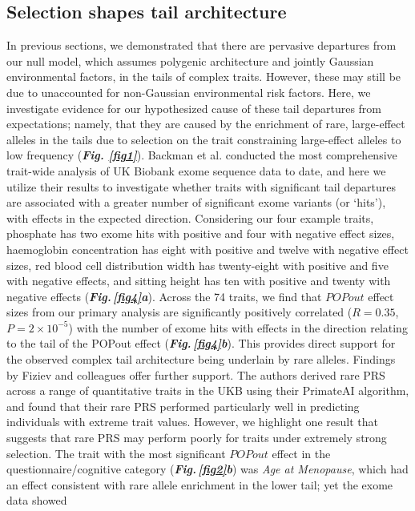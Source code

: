 \documentclass[12pt]{zHenriquesLab-StyleBioRxiv}
\newcommand\fref[1]{\normalsize{\textbf{\textit{Fig. \ref{#1}}}}\normalsize{}}
\newcommand\dref[2]{\normalsize{\textbf{\textit{Fig.\,\ref{#1}#2}}}\normalsize{}}
\begin{document}
\subsection*{Selection shapes tail architecture}
In previous sections, we demonstrated that there are 
pervasive departures from our null model, which assumes 
polygenic architecture and jointly Gaussian environmental 
factors, in the tails of complex traits. However, these 
may still be due to unaccounted for non-Gaussian environmental 
risk factors. Here, we investigate evidence for our 
hypothesized cause of these tail departures from expectations; 
namely, that they are caused by the enrichment of rare, 
large-effect alleles in the tails due to selection on the 
trait constraining large-effect alleles to low frequency 
(\fref{fig1}). Backman et al. \cite{Backman2021} conducted 
the most comprehensive trait-wide analysis of UK Biobank 
exome sequence data to date, and here we utilize their 
results to investigate whether traits with significant tail 
departures are associated with a greater number of significant 
exome variants (or ‘hits’), with effects in the expected 
direction. Considering our four example traits, phosphate has
two exome hits with positive and four with negative 
effect sizes, haemoglobin concentration has eight with 
positive and twelve with negative effect sizes, red blood 
cell distribution width has twenty-eight with positive and 
five with negative effects, and sitting height has ten with 
positive and twenty with negative effects (\dref{fig4}{a}). 
Across the 74 traits, we find that $POPout$ effect sizes from 
our primary analysis are significantly positively 
correlated ($R=0.35$, $P=2\times10^{-5}$) with the 
number of exome hits with effects in the direction 
relating to the tail of the POPout 
effect (\dref{fig4}{b}). This provides direct 
support for the observed complex tail architecture 
being underlain by rare alleles. Findings by Fiziev and 
colleagues \cite{Fiziev2023} offer further support. 
The authors derived rare PRS across a range of quantitative 
traits in the UKB using their PrimateAI algorithm, and 
found that their rare PRS performed particularly well in 
predicting individuals with extreme trait values. 
However, we highlight one result that suggests that rare 
PRS may perform poorly for traits under extremely strong 
selection. The trait with the most significant $POPout$ 
effect in the questionnaire/cognitive category 
(\dref{fig2}{b}) was \textit{Age at Menopause}, 
which had an effect consistent with rare allele 
enrichment in the lower tail; yet the exome data showed 
\end{document}
